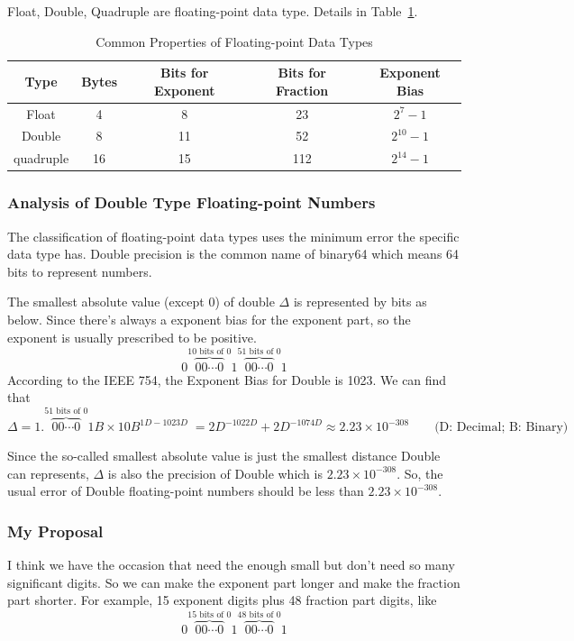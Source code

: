 \documentclass{article}
\begin{document}
Float, Double, Quadruple are floating-point data type. Details in Table~\ref{tab:floating-point}.

\begin{table}[!ht]
    \centering
    \begin{tabular}{|c|c|c|c|c|}
    \hline
        Type & Bytes & Bits for Exponent & Bits for Fraction & Exponent Bias  \\ \hline
        Float & 4 & 8 & 23 & $2^7 - 1$   \\ \hline
        Double & 8 & 11 & 52 & $2^{10} - 1$  \\ \hline
        quadruple & 16 & 15 & 112 & $2^{14} - 1 $  \\ \hline
    \end{tabular}
    \caption{Common Properties of Floating-point Data Types}
    \label{tab:floating-point}
\end{table}

\subsubsection{Analysis of Double Type Floating-point Numbers}
The classification of floating-point data types uses the minimum error the specific data type has. Double precision is the common name of binary64 which means 64 bits to represent numbers.

The smallest absolute value (except $0$) of double $\Delta$ is represented by bits as below. Since there's always a exponent bias for the exponent part, so the exponent is usually prescribed to be positive.
$$
0\overbrace{00\cdots0}^{10 \text{ bits of } 0}1 \overbrace{00\cdots0}^{51 \text{ bits of } 0}1
$$
According to the IEEE 754, the Exponent Bias for Double is 1023. We can find that
 $$\Delta = 1.\overbrace{00\cdots0}^{51 \text{ bits of } 0}1B \times 10B^{1D-1023D} \; = 2D^{-1022D} + 2D^{-1074D}  \approx 2.23 \times 10^{-308} \qquad \text{(D: Decimal; B: Binary)}$$

Since the so-called smallest absolute value is just the smallest distance Double can represents, $\Delta$ is also the precision of Double which is $2.23 \times 10^{-308}$. So, the usual error of Double floating-point numbers should be less than $2.23 \times 10^{-308}$.

\subsubsection{My Proposal}
I think we have the occasion that need the enough small but don't need so many significant digits. So we can make the exponent part longer and make the fraction part shorter. For example, 15 exponent digits plus 48 fraction part digits, like
$$
0\overbrace{00\cdots0}^{15 \text{ bits of } 0}1 \overbrace{00\cdots0}^{48 \text{ bits of } 0}1
$$
\end{document}

